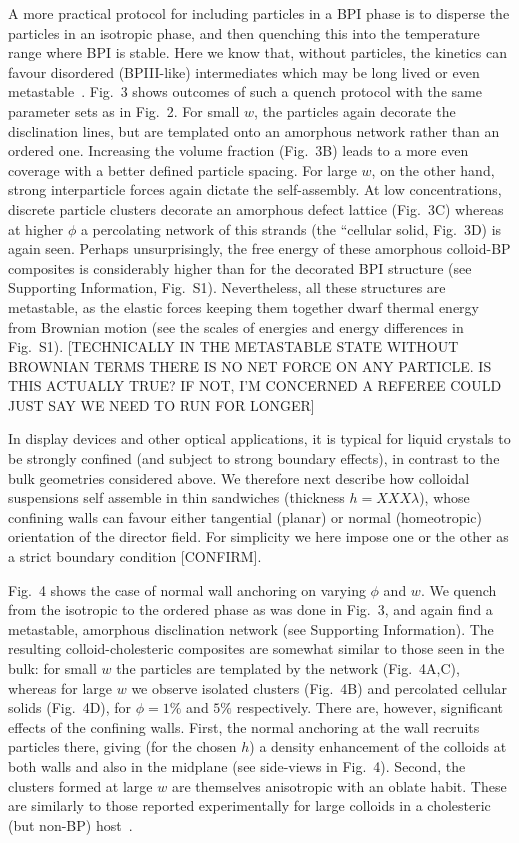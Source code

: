 \documentclass[12pt]{article}
\begin{document}
A more practical protocol for including particles in a BPI phase is to disperse the particles in an isotropic phase, and then quenching this into the temperature range where BPI is stable. Here we know that, without particles, the kinetics can favour disordered (BPIII-like) intermediates which may be long lived or even metastable~\cite{domaingrowth}. Fig.~3 shows outcomes of such a quench protocol with the same parameter sets as in Fig.~2. For small $w$, the particles again decorate the disclination lines, but are templated onto an amorphous network rather than an ordered one.
Increasing the volume fraction (Fig.~3B) leads to a more even coverage with
a better defined particle spacing. 
For large $w$, on the other hand, strong interparticle forces again dictate
the self-assembly. At low concentrations, discrete particle clusters decorate an amorphous defect lattice (Fig.~3C) whereas at higher $\phi$ a percolating network of this strands (the ``cellular solid, Fig.~3D) is again seen. Perhaps unsurprisingly, the free energy of these amorphous colloid-BP composites is considerably higher than for the decorated BPI structure (see Supporting Information, Fig.~S1). Nevertheless, all these structures
are metastable, as the elastic forces keeping them together dwarf thermal
energy from Brownian motion (see the scales of energies and energy
differences in Fig.~S1). [TECHNICALLY IN THE METASTABLE STATE WITHOUT BROWNIAN TERMS THERE IS NO NET FORCE ON ANY PARTICLE. IS THIS ACTUALLY TRUE? IF NOT, I'M CONCERNED A REFEREE COULD JUST SAY WE NEED TO RUN FOR LONGER]



In display devices and other optical applications, it is typical for liquid crystals to be strongly confined (and subject to strong boundary effects), in contrast to the bulk geometries considered above. We therefore next describe
how colloidal suspensions self assemble in thin sandwiches (thickness $h = XXX \lambda$), whose confining walls can favour either tangential (planar) or normal (homeotropic) orientation of the director field. For simplicity we here impose one or the other as a strict boundary condition [CONFIRM].

Fig.~4 shows the case of normal wall anchoring on varying $\phi$ and $w$. We quench from the isotropic
to the ordered phase as was done in Fig.~3, and again find a metastable, amorphous disclination network (see Supporting Information). The resulting colloid-cholesteric composites 
are somewhat similar to those seen in the bulk: for small $w$ the particles are templated by the network (Fig.~4A,C), 
whereas for large $w$ we observe isolated
clusters (Fig.~4B) and percolated cellular solids (Fig.~4D), for
$\phi = 1\%$ and $5\%$ respectively. There are, however, significant 
effects of the confining walls.
First, the normal anchoring at the wall recruits particles there,  giving (for the chosen $h$) a density enhancement of the colloids at both walls and also in the midplane (see side-views in Fig.~4). Second,
the clusters formed at large $w$ are themselves anisotropic with an oblate habit. These are similarly to those reported experimentally for large colloids in a cholesteric (but non-BP) host~\cite{niek}.
 
\end{document}
